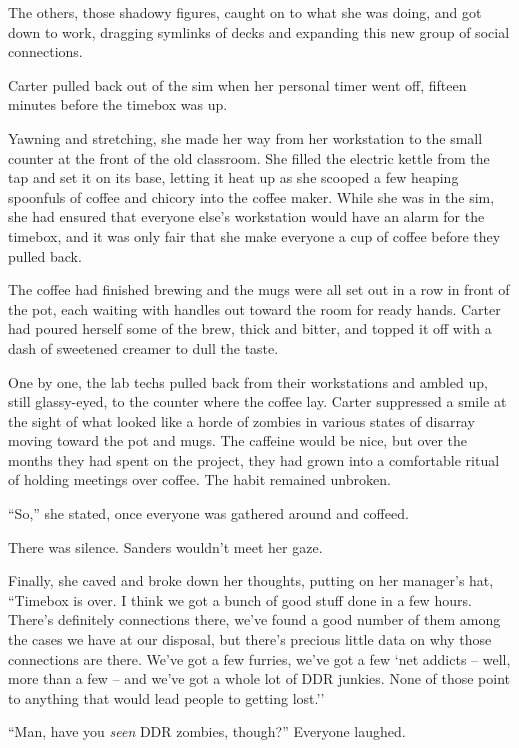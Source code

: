 The others, those shadowy figures, caught on to what she was doing, and got down to work, dragging symlinks of decks and expanding this new group of social connections.

\secdiv

Carter pulled back out of the sim when her personal timer went off, fifteen minutes before the timebox was up.

Yawning and stretching, she made her way from her workstation to the small counter at the front of the old classroom.  She filled the electric kettle from the tap and set it on its base, letting it heat up as she scooped a few heaping spoonfuls of coffee and chicory into the coffee maker.  While she was in the sim, she had ensured that everyone else's workstation would have an alarm for the timebox, and it was only fair that she make everyone a cup of coffee before they pulled back.

The coffee had finished brewing and the mugs were all set out in a row in front of the pot, each waiting with handles out toward the room for ready hands.  Carter had poured herself some of the brew, thick and bitter, and topped it off with a dash of sweetened creamer to dull the taste.

One by one, the lab techs pulled back from their workstations and ambled up, still glassy-eyed, to the counter where the coffee lay.  Carter suppressed a smile at the sight of what looked like a horde of zombies in various states of disarray moving toward the pot and mugs.  The caffeine would be nice, but over the months they had spent on the project, they had grown into a comfortable ritual of holding meetings over coffee.  The habit remained unbroken.

``So,'' she stated, once everyone was gathered around and coffeed.

There was silence.  Sanders wouldn't meet her gaze.

Finally, she caved and broke down her thoughts, putting on her manager's hat, ``Timebox is over.  I think we got a bunch of good stuff done in a few hours.  There's definitely connections there, we've found a good number of them among the cases we have at our disposal, but there's precious little data on why those connections are there.  We've got a few furries, we've got a few `net addicts -- well, more than a few -- and we've got a whole lot of DDR junkies.  None of those point to anything that would lead people to getting lost.''

``Man, have you \textit{seen} DDR zombies, though?''  Everyone laughed.

